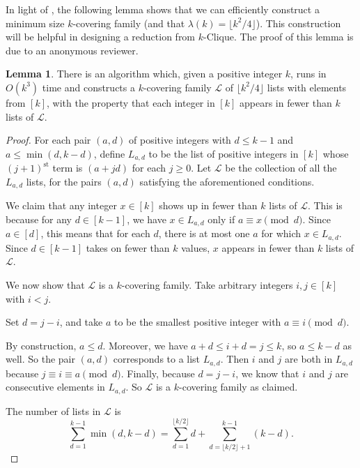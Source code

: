 \documentclass[11pt]{article}
\theoremstyle{definition}
\newtheorem{lemma}[theorem]{Lemma}
\begin{document}
In light of , the following lemma shows that we can efficiently construct a minimum size $k$-covering family (and that $\lambda(k) = \lfloor k^2/4\rfloor$).
This construction will be helpful in designing a reduction from \textsf{$k$-Clique}.
The proof of this lemma is due to an anonymous reviewer. 

\begin{lemma}
    \label{puzzle-solution}
    There is an algorithm which, given a positive integer $k$, runs in $O(k^3)$ time and constructs a 
     $k$-covering family $\mathcal{L}$ of $\lfloor k^2/4\rfloor$ lists with elements from $[k]$, with the property that each integer in $[k]$ appears in fewer than $k$ lists of $\mathcal{L}$.
\end{lemma}

\begin{proof} 

    For each pair $(a,d)$ of positive integers with $d\le k-1$ and $a\le \min(d,k-d)$, define $L_{a,d}$ to be the list of positive integers in $[k]$ whose $(j+1)^{\text{st}}$ term is $(a+jd)$ for each $j\ge 0$.
    Let $\mathcal{L}$ be the collection of all the $L_{a,d}$ lists, for the pairs $(a,d)$ satisfying the aforementioned conditions. 

    We claim that any integer $x\in [k]$ shows up in fewer than $k$ lists of $\mathcal{L}$.
    This is because for any $d\in [k-1]$, we have $x\in L_{a,d}$ only if $a\equiv x\pmod d$.
    Since $a\in [d]$, this means that for each $d$, there is at most one $a$ for which $x\in L_{a,d}$.
    Since $d\in [k-1]$ takes on fewer than $k$ values,  $x$ appears in fewer than $k$ lists of $\mathcal{L}$.

    We now show that $\mathcal{L}$ is a $k$-covering family.
    Take arbitrary integers $i,j\in [k]$ with $i < j$.
    
    Set $d = j-i$, and take $a$ to be the smallest positive integer with $a\equiv i\pmod d$.
    
    By construction, $a\le d$.
    Moreover, we have $a+d\le i+d = j\le k$, so $a\le k-d$ as well.
    So the pair $(a,d)$ corresponds to a list $L_{a,d}$.
    Then $i$ and $j$ are both in $L_{a,d}$ because $j\equiv i\equiv a\pmod d$.
    Finally, because $d = j-i$, we know that $i$ and $j$ are consecutive elements in $L_{a,d}$.
    So $\mathcal{L}$ is a  $k$-covering family as claimed.

    The number of lists in $\mathcal{L}$ is 
        \begin{equation}
        \label{eq:num-lists}
            \sum_{d=1}^{k-1} \min(d,k-d) = \sum_{d=1}^{\lfloor k/2\rfloor} d + \sum_{d=\lfloor k/2\rfloor + 1}^{k-1} (k-d).
        \end{equation}


\end{proof}
\end{document}
